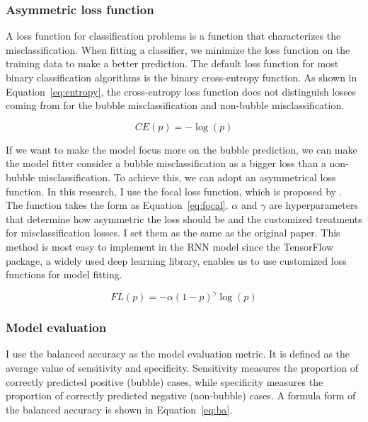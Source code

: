 \documentclass[12pt, man, a4paper, floatsintext]{apa7}
\begin{document}
\subsubsection{Asymmetric loss function}

A loss function for classification problems is a function that characterizes the misclassification. When fitting a classifier, we minimize the loss function on the training data to make a better prediction. The default loss function for most binary classification algorithms is the binary cross-entropy function. As shown in Equation~\ref{eq:entropy}, the cross-entropy loss function does not distinguish losses coming from for the bubble misclassification and non-bubble misclassification. 

\begin{equation}
    CE(p) = -\log(p)
    \label{eq:entropy}
\end{equation}

If we want to make the model focus more on the bubble prediction, we can make the model fitter consider a bubble misclassification as a bigger loss than a non-bubble misclassification. To achieve this, we can adopt an asymmetrical loss function. In this research, I use the focal loss function, which is proposed by \textcite{focal}. The function takes the form as Equation~\ref{eq:focal}. $\alpha$ and $\gamma$ are hyperparameters that determine how asymmetric the loss should be and the customized treatments for misclassification losses. I set them as the same as the original paper. This method is most easy to implement in the RNN model since the TensorFlow package, a widely used deep learning library, enables us to use customized loss functions for model fitting.

\begin{equation}
    FL(p) = -\alpha (1-p)^\gamma \log(p)
    \label{eq:focal}
\end{equation}

\subsubsection{Model evaluation}

I use the balanced accuracy as the model evaluation metric. It is defined as the average value of sensitivity and specificity. Sensitivity measures the proportion of correctly predicted positive (bubble) cases, while specificity measures the proportion of correctly predicted negative (non-bubble) cases. A formula form of the balanced accuracy is shown in Equation~\ref{eq:ba}.
\end{document}
